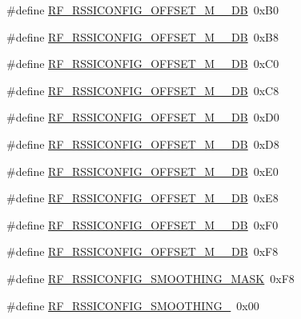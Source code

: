 \begin{DoxyCompactItemize}
\item 
\#define \mbox{\hyperlink{sx1276_regs-_fsk_8h_ac5d1af16b9ab32202350604e20ff97ca}{R\+F\+\_\+\+R\+S\+S\+I\+C\+O\+N\+F\+I\+G\+\_\+\+O\+F\+F\+S\+E\+T\+\_\+\+M\+\_\+\_\+\+DB}}~0x\+B0
\item 
\#define \mbox{\hyperlink{sx1276_regs-_fsk_8h_adc8551bf57dfe63c6f6f5ae1610dfb90}{R\+F\+\_\+\+R\+S\+S\+I\+C\+O\+N\+F\+I\+G\+\_\+\+O\+F\+F\+S\+E\+T\+\_\+\+M\+\_\+\_\+\+DB}}~0x\+B8
\item 
\#define \mbox{\hyperlink{sx1276_regs-_fsk_8h_a2974c4a75b7464841728fb56d662743b}{R\+F\+\_\+\+R\+S\+S\+I\+C\+O\+N\+F\+I\+G\+\_\+\+O\+F\+F\+S\+E\+T\+\_\+\+M\+\_\+\_\+\+DB}}~0x\+C0
\item 
\#define \mbox{\hyperlink{sx1276_regs-_fsk_8h_a90e12bf75d247cefc76360f6b6b65c36}{R\+F\+\_\+\+R\+S\+S\+I\+C\+O\+N\+F\+I\+G\+\_\+\+O\+F\+F\+S\+E\+T\+\_\+\+M\+\_\+\_\+\+DB}}~0x\+C8
\item 
\#define \mbox{\hyperlink{sx1276_regs-_fsk_8h_ad7061fda6354ecec243b4cf450f80fdf}{R\+F\+\_\+\+R\+S\+S\+I\+C\+O\+N\+F\+I\+G\+\_\+\+O\+F\+F\+S\+E\+T\+\_\+\+M\+\_\+\_\+\+DB}}~0x\+D0
\item 
\#define \mbox{\hyperlink{sx1276_regs-_fsk_8h_a9231b5019a52af5f09d67e4f0c76b681}{R\+F\+\_\+\+R\+S\+S\+I\+C\+O\+N\+F\+I\+G\+\_\+\+O\+F\+F\+S\+E\+T\+\_\+\+M\+\_\+\_\+\+DB}}~0x\+D8
\item 
\#define \mbox{\hyperlink{sx1276_regs-_fsk_8h_a3c584e4445cc29c7ea1faa931383f5bf}{R\+F\+\_\+\+R\+S\+S\+I\+C\+O\+N\+F\+I\+G\+\_\+\+O\+F\+F\+S\+E\+T\+\_\+\+M\+\_\+\_\+\+DB}}~0x\+E0
\item 
\#define \mbox{\hyperlink{sx1276_regs-_fsk_8h_a931a618c3206621f7a13ed8e2b7dfc85}{R\+F\+\_\+\+R\+S\+S\+I\+C\+O\+N\+F\+I\+G\+\_\+\+O\+F\+F\+S\+E\+T\+\_\+\+M\+\_\+\_\+\+DB}}~0x\+E8
\item 
\#define \mbox{\hyperlink{sx1276_regs-_fsk_8h_a07f627585a0fb052af36c054b1aa998d}{R\+F\+\_\+\+R\+S\+S\+I\+C\+O\+N\+F\+I\+G\+\_\+\+O\+F\+F\+S\+E\+T\+\_\+\+M\+\_\+\_\+\+DB}}~0x\+F0
\item 
\#define \mbox{\hyperlink{sx1276_regs-_fsk_8h_a1bda3872a2df71ff4834111e75210880}{R\+F\+\_\+\+R\+S\+S\+I\+C\+O\+N\+F\+I\+G\+\_\+\+O\+F\+F\+S\+E\+T\+\_\+\+M\+\_\+\_\+\+DB}}~0x\+F8
\item 
\#define \mbox{\hyperlink{sx1276_regs-_fsk_8h_a8ff6402df6371ff0d43d3cc044cd24ae}{R\+F\+\_\+\+R\+S\+S\+I\+C\+O\+N\+F\+I\+G\+\_\+\+S\+M\+O\+O\+T\+H\+I\+N\+G\+\_\+\+M\+A\+SK}}~0x\+F8
\item 
\#define \mbox{\hyperlink{sx1276_regs-_fsk_8h_ab42a5844e4a21615cbe58162237dd17f}{R\+F\+\_\+\+R\+S\+S\+I\+C\+O\+N\+F\+I\+G\+\_\+\+S\+M\+O\+O\+T\+H\+I\+N\+G\+\_}}~0x00

\end{DoxyCompactItemize}
